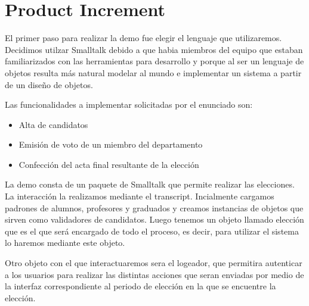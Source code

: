 \section{Product Increment}

El primer paso para realizar la demo fue elegir el lenguaje que utilizaremos.
Decidimos utilzar Smalltalk debido a que habia miembros del equipo que estaban familiarizados con las herramientas para desarrollo 
y porque al ser un lenguaje de objetos resulta m\'as natural modelar al mundo e implementar un sistema a partir de un dise\~no de objetos.

\medskip

Las funcionalidades a implementar solicitadas por el enunciado son:
\begin{itemize}
 \item Alta de candidatos
 \item Emisi\'on de voto de un miembro del departamento
 \item Confecci\'on del acta final resultante de la elecci\'on
\end{itemize}

\medskip

La demo consta de un paquete de Smalltalk que permite realizar las elecciones.
La interacci\'on la realizamos mediante el transcript. Incialmente cargamos padrones de alumnos, profesores y graduados y creamos instancias de objetos
que sirven como validadores de candidatos. Luego tenemos un objeto llamado elecci\'on que es el que ser\'a encargado de todo el proceso, es decir,
para utilizar el sistema lo haremos mediante este objeto.

Otro objeto con el que interactuaremos sera el logeador, que permitira autenticar
a los usuarios para realizar las distintas acciones que seran enviadas por medio de la interfaz correspondiente al periodo de elecci\'on en la que se
encuentre la elecci\'on.
